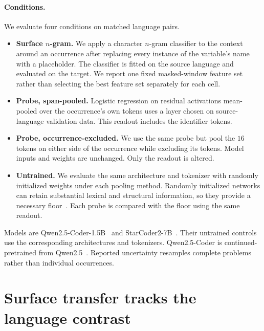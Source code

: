 \documentclass{article}
\begin{document}
\paragraph{Conditions.}
We evaluate four conditions on matched language pairs.

\begin{itemize}\itemsep2pt
\item \textbf{Surface $n$-gram.} We apply a character $n$-gram classifier to
the context around an occurrence after replacing every instance of the
variable's name with a placeholder. The classifier is fitted on the source language and
evaluated on the target. We report one fixed masked-window feature set rather
than selecting the best feature set separately for each cell.
\item \textbf{Probe, span-pooled.} Logistic regression on residual activations
mean-pooled over the occurrence's own tokens uses a layer chosen on
source-language validation data. This readout includes the identifier tokens.
\item \textbf{Probe, occurrence-excluded.} We use the same probe but pool the
$16$ tokens on either side of the occurrence while excluding its tokens. Model
inputs and weights are unchanged. Only the readout is altered.
\item \textbf{Untrained.} We evaluate the same architecture and tokenizer with
randomly initialized weights under each pooling method. Randomly initialized networks
can retain substantial lexical and structural information, so they provide a
necessary floor~\citep{zhang2018language,hewitt2019control}. Each probe is
compared with the floor using the same readout.
\end{itemize}

Models are Qwen2.5-Coder-1.5B~\citep{hui2024qwencoder} and
StarCoder2-7B~\citep{lozhkov2024starcoder2}. Their untrained controls use the
corresponding architectures and tokenizers. Qwen2.5-Coder is
continued-pretrained from Qwen2.5~\citep{qwen2024qwen25}. Reported uncertainty
resamples complete problems rather than individual occurrences.

\section{Surface transfer tracks the language contrast}
\end{document}
